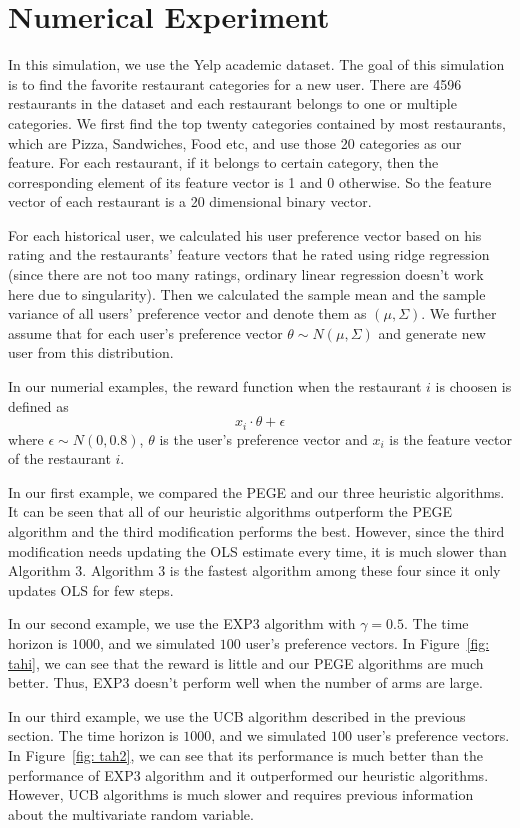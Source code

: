 \documentclass{article}
\theoremstyle{plain}
\theoremstyle{definition}
\begin{document}
\section{Numerical Experiment}
In this simulation, we use the Yelp academic dataset. The goal of this simulation is to find the favorite restaurant categories for a new user. There are 4596 restaurants in the dataset and each restaurant belongs to one or multiple categories. We first find the top twenty categories contained by most restaurants, which are Pizza, Sandwiches, Food etc, and use those 20 categories as our feature. For each restaurant, if it belongs to certain category, then the corresponding element of its feature vector is 1 and 0 otherwise. So the feature vector of each restaurant is a 20 dimensional binary vector. 

For each historical user, we calculated his user preference vector based on his rating and the restaurants' feature vectors that he rated using ridge regression (since there are not too many ratings, ordinary linear regression doesn't work here due to singularity). Then we calculated the sample mean and the sample variance of all users' preference vector and denote them as $(\mu,\Sigma)$. We further assume that for each user's preference vector $\theta\sim N(\mu,\Sigma)$ and generate new user from this distribution.

In our numerial examples, the reward function when the restaurant
$i$ is choosen is defined as 
\[
x_{i}\cdot\theta+\epsilon
\]
where $\epsilon\sim N\left(0,0.8\right)$, $\theta$ is the user's
preference vector and $x_{i}$ is the feature vector of the restaurant
$i$.

In our first example, we compared the PEGE and our three heuristic algorithms. It can be seen that all of our heuristic algorithms outperform the PEGE algorithm and the third modification performs the best. However, since the third modification needs updating the OLS estimate every time, it is much slower than Algorithm 3. Algorithm 3 is the fastest algorithm among these four since it only updates OLS for few steps.


In our second example, we use the EXP3 algorithm with $\gamma=0.5$.
The time horizon is $1000$, and we simulated $100$ user's preference
vectors. In Figure~\ref{fig: tahi}, we can see that the reward is little and our PEGE algorithms are much better. Thus, EXP3 doesn't perform well when the number of arms are large.

In our third example, we use the UCB algorithm described in the previous
section. The time horizon is $1000$, and we simulated $100$ user's
preference vectors.  In Figure~\ref{fig: tah2}, we can see that its performance is much better than the performance of EXP3 algorithm and it outperformed our heuristic algorithms. However, UCB algorithms is much slower and requires previous information about the multivariate random variable.
\end{document}
